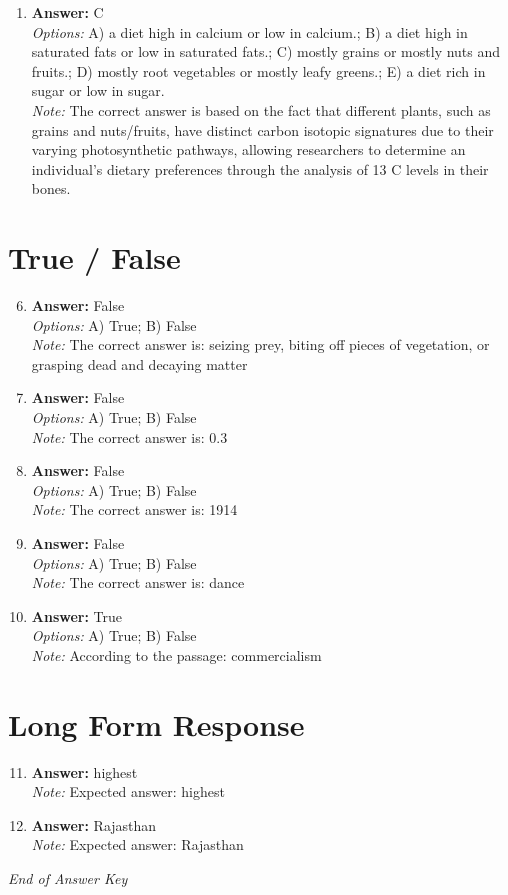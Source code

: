 \documentclass[12pt]{article}
\begin{document}
\begin{enumerate}[label=\arabic*.]
\\ \textit{Note:} The Mousterian tool technology, characterized by the production of flake tools and associated with the Middle Paleolithic period, is specifically linked to Neandertals, reflecting their advanced craftsmanship and adaptation to their environment.
\item \textbf{Answer:} C
\\ \textit{Options:} A) a diet high in calcium or low in calcium.; B) a diet high in saturated fats or low in saturated fats.; C) mostly grains or mostly nuts and fruits.; D) mostly root vegetables or mostly leafy greens.; E) a diet rich in sugar or low in sugar.
\\ \textit{Note:} The correct answer is based on the fact that different plants, such as grains and nuts/fruits, have distinct carbon isotopic signatures due to their varying photosynthetic pathways, allowing researchers to determine an individual's dietary preferences through the analysis of 13 C levels in their bones.
\end{enumerate}

\section*{True / False}
\begin{enumerate}[label=\arabic*.]
\setcounter{enumi}{5}
\item \textbf{Answer:} False
\\ \textit{Options:} A) True; B) False
\\ \textit{Note:} The correct answer is: seizing prey, biting off pieces of vegetation, or grasping dead and decaying matter
\item \textbf{Answer:} False
\\ \textit{Options:} A) True; B) False
\\ \textit{Note:} The correct answer is: 0.3
\item \textbf{Answer:} False
\\ \textit{Options:} A) True; B) False
\\ \textit{Note:} The correct answer is: 1914
\item \textbf{Answer:} False
\\ \textit{Options:} A) True; B) False
\\ \textit{Note:} The correct answer is: dance
\item \textbf{Answer:} True
\\ \textit{Options:} A) True; B) False
\\ \textit{Note:} According to the passage: commercialism
\end{enumerate}

\section*{Long Form Response}
\begin{enumerate}[label=\arabic*.]
\setcounter{enumi}{10}
\item \textbf{Answer:} highest
\\ \textit{Note:} Expected answer: highest
\item \textbf{Answer:} Rajasthan
\\ \textit{Note:} Expected answer: Rajasthan
\end{enumerate}

\vfill
\noindent\textit{End of Answer Key}
\end{document}
